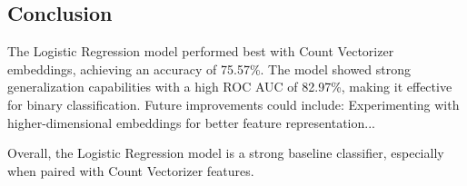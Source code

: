 \subsection{Conclusion}

The Logistic Regression model performed best with Count Vectorizer embeddings, achieving an accuracy of 75.57\%. The model showed strong generalization capabilities with a high ROC AUC of 82.97\%, making it effective for binary classification. Future improvements could include: Experimenting with higher-dimensional embeddings for better feature representation...

Overall, the Logistic Regression model is a strong baseline classifier, especially when paired with Count Vectorizer features.

